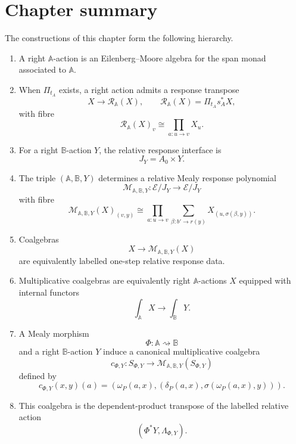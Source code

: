 \section{Chapter summary}
\label{sec:poly-relative-summary}

\begin{theorem}
\label{thm:poly-relative-main-consolidation}
The constructions of this chapter form the following hierarchy.

\begin{enumerate}
\item A right \(\mathbb A\)-action is an Eilenberg--Moore algebra for the span
monad associated to \(\mathbb A\).

\item When \(\Pi_{t_A}\) exists, a right action admits a response transpose
\[
X\to\mathcal R_{\mathbb A}(X),
\qquad
\mathcal R_{\mathbb A}(X)=\Pi_{t_A}s_A^\ast X,
\]
with fibre
\[
\mathcal R_{\mathbb A}(X)_v
\cong
\prod_{a:u\to v}X_u.
\]

\item For a right \(\mathbb B\)-action \(Y\), the relative response interface is
\[
J_Y=A_0\times Y.
\]

\item The triple \((\mathbb A,\mathbb B,Y)\) determines a relative Mealy
response polynomial
\[
\mathcal M_{\mathbb A,\mathbb B,Y}:
\mathcal E/J_Y\to\mathcal E/J_Y
\]
with fibre
\[
\mathcal M_{\mathbb A,\mathbb B,Y}(X)_{(v,y)}
\cong
\prod_{a:u\to v}
\sum_{\beta:b'\to r(y)}
X_{(u,\sigma(\beta,y))}.
\]

\item Coalgebras
\[
X\to\mathcal M_{\mathbb A,\mathbb B,Y}(X)
\]
are equivalently labelled one-step relative response data.

\item Multiplicative coalgebras are equivalently right \(\mathbb A\)-actions
\(X\) equipped with internal functors
\[
\int_{\mathbb A}X\to\int_{\mathbb B}Y.
\]

\item A Mealy morphism
\[
\Phi:\mathbb A\rightsquigarrow\mathbb B
\]
and a right \(\mathbb B\)-action \(Y\) induce a canonical multiplicative
coalgebra
\[
c_{\Phi,Y}:
S_{\Phi,Y}\to
\mathcal M_{\mathbb A,\mathbb B,Y}(S_{\Phi,Y})
\]
defined by
\[
c_{\Phi,Y}(x,y)(a)
=
\left(
\omega_P(a,x),
\left(
\delta_P(a,x),
\sigma(\omega_P(a,x),y)
\right)
\right).
\]

\item This coalgebra is the dependent-product transpose of the labelled
relative action
\[
(\Phi^\ast Y,\Lambda_{\Phi,Y}).
\]


\end{enumerate}
\end{theorem}
